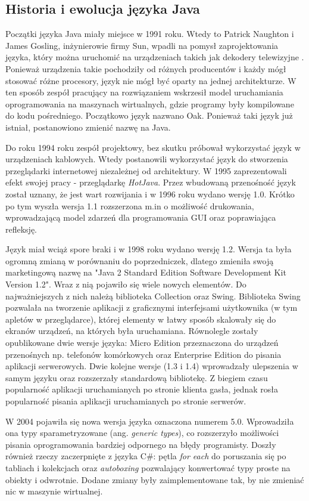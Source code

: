 \subsection{Historia i ewolucja języka Java}
Początki języka Java miały miejsce w 1991 roku. Wtedy to Patrick Naughton i James Gosling, inżynierowie firmy Sun,  wpadli na pomysł zaprojektowania języka, który  można uruchomić na urządzeniach takich jak dekodery telewizyjne \cite{java8}. Ponieważ urządzenia takie pochodziły od różnych producentów i każdy mógł stosować różne procesory, język nie mógł być oparty na jednej architekturze. W ten sposób zespół pracujący na rozwiązaniem wskrzesił model uruchamiania oprogramowania na maszynach wirtualnych, gdzie programy były kompilowane do kodu pośredniego.  
Początkowo język nazwano Oak. Ponieważ taki język już istniał, postanowiono zmienić nazwę na Java.

Do roku 1994 roku zespół projektowy, bez skutku próbował wykorzystać język w urządzeniach kablowych. Wtedy postanowili wykorzystać język do stworzenia przeglądarki internetowej niezależnej od architektury. W 1995 zaprezentowali efekt swojej pracy - przeglądarkę \textsl{HotJava}. Przez wbudowaną przenośność język został uznany, że jest wart rozwijania i w 1996 roku wydano wersję 1.0. Krótko po tym wyszła wersja 1.1 rozszerzona m.in o możliwość drukowania, wprowadzającą model zdarzeń dla programowania GUI oraz poprawiająca refleksję.

Język miał wciąż spore braki i w 1998 roku wydano wersję 1.2. Wersja ta była ogromną zmianą w porównaniu do poprzedniczek, dlatego zmieniła swoją marketingową nazwę na "Java 2 Standard Edition Software Development Kit Version 1.2". Wraz z nią pojawiło się wiele nowych elementów. Do najważniejszych z nich należą biblioteka Collection oraz Swing. Biblioteka Swing pozwalała na tworzenie aplikacji z graficznymi interfejsami użytkownika (w tym apletów w przeglądarce), której elementy w łatwy sposób skalowały się do ekranów urządzeń, na których była uruchamiana. Równolegle zostały opublikowane dwie wersje języka: Micro Edition przeznaczona do urządzeń przenośnych np. telefonów komórkowych oraz Enterprise Edition do pisania aplikacji serwerowych. Dwie kolejne wersje (1.3 i 1.4) wprowadzały ulepszenia w samym języku oraz rozszerzały standardową bibliotekę. Z biegiem czasu popularność aplikacji uruchamianych po stronie klienta gasła, jednak rosła popularność pisania aplikacji uruchamianych po stronie serwerów.

W 2004 pojawiła się nowa wersja języka oznaczona numerem 5.0. Wprowadziła ona typy sparametryzowane (ang. \textsl{generic types}), co rozszerzyło możliwości pisania oprogramowania bardziej odpornego na błędy programisty. Doszły również rzeczy zaczerpnięte z języka C\#: pętla \textsl{for each} do poruszania się po tabliach i kolekcjach oraz \textsl{autoboxing} pozwalający konwertować typy proste na obiekty i odwrotnie. Dodane zmiany były zaimplementowane tak, by nie zmieniać nic w maszynie wirtualnej.

